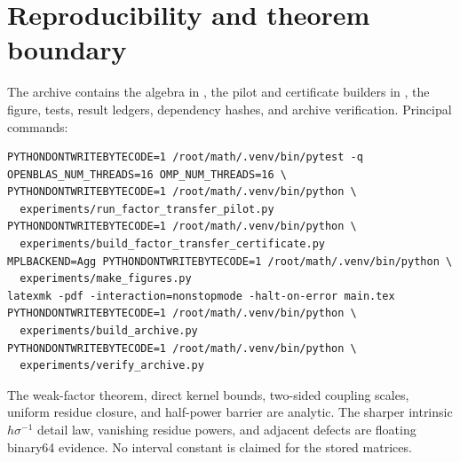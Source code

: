 \documentclass[11pt]{article}
\theoremstyle{remark}
\begin{document}
\section{Reproducibility and theorem boundary}

The archive contains the algebra in , the pilot
and certificate builders in , the figure, tests, result
ledgers, dependency hashes, and archive verification.  Principal commands:
\begin{verbatim}
PYTHONDONTWRITEBYTECODE=1 /root/math/.venv/bin/pytest -q
OPENBLAS_NUM_THREADS=16 OMP_NUM_THREADS=16 \
PYTHONDONTWRITEBYTECODE=1 /root/math/.venv/bin/python \
  experiments/run_factor_transfer_pilot.py
PYTHONDONTWRITEBYTECODE=1 /root/math/.venv/bin/python \
  experiments/build_factor_transfer_certificate.py
MPLBACKEND=Agg PYTHONDONTWRITEBYTECODE=1 /root/math/.venv/bin/python \
  experiments/make_figures.py
latexmk -pdf -interaction=nonstopmode -halt-on-error main.tex
PYTHONDONTWRITEBYTECODE=1 /root/math/.venv/bin/python \
  experiments/build_archive.py
PYTHONDONTWRITEBYTECODE=1 /root/math/.venv/bin/python \
  experiments/verify_archive.py
\end{verbatim}

The weak-factor theorem, direct kernel bounds, two-sided coupling scales,
uniform residue closure, and half-power barrier are analytic.  The sharper
intrinsic \(h\sigma^{-1}\) detail law, vanishing residue powers, and
adjacent defects are floating binary64 evidence.  No interval constant is
claimed for the stored matrices.



\end{document}
